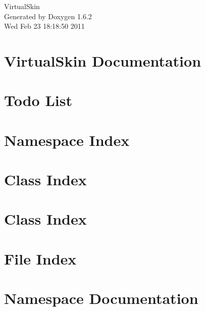 \documentclass[a4paper]{book}
\begin{document}
\hypersetup{pageanchor=false}
\begin{titlepage}
\vspace*{7cm}
\begin{center}
{\Large VirtualSkin }\\
\vspace*{1cm}
{\large Generated by Doxygen 1.6.2}\\
\vspace*{0.5cm}
{\small Wed Feb 23 18:18:50 2011}\\
\end{center}
\end{titlepage}
\clearemptydoublepage
{}
\tableofcontents
\clearemptydoublepage
{}
\hypersetup{pageanchor=true}
\chapter{VirtualSkin Documentation}
\label{index}\hypertarget{index}{}
\chapter{Todo List}
\label{todo}
\hypertarget{todo}{}

\chapter{Namespace Index}

\chapter{Class Index}

\chapter{Class Index}

\chapter{File Index}

\chapter{Namespace Documentation}




\end{document}
